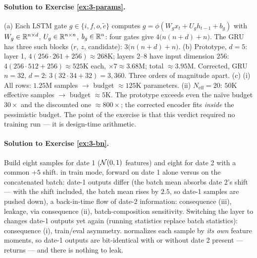 \paragraph{Solution to Exercise \ref{ex:3-params}.}
(a) Each LSTM gate $g \in \{i, f, o, \tilde c\}$ computes
$g = \phi(W_g x_t + U_g h_{t-1} + b_g)$ with $W_g \in \mathbb{R}^{n \times d}$,
$U_g \in \mathbb{R}^{n \times n}$, $b_g \in \mathbb{R}^n$: four gates give
$4\bigl(n(n+d) + n\bigr)$. The GRU has three such blocks ($r$, $z$,
candidate): $3\bigl(n(n+d)+n\bigr)$. (b) Prototype, $d = 5$: layer 1,
$4(256 \cdot 261 + 256) \approx 268$K; layers 2--8 have input dimension
$256$: $4(256 \cdot 512 + 256) \approx 525$K each, $\times 7 \approx
3.68$M; total $\approx 3.95$M. Corrected, GRU $n = 32$, $d = 2$:
$3(32 \cdot 34 + 32) = 3{,}360$. Three orders of magnitude apart.
(c) (i) All rows: $1.25$M samples $\to$ budget $\approx 125$K parameters.
(ii) $N_{\text{eff}} = 20$: $50$K effective samples $\to$ budget
$\approx 5$K. The prototype exceeds even the na\"ive budget $30\times$ and
the discounted one $\approx 800\times$; the corrected encoder fits
\emph{inside} the pessimistic budget. The point of the exercise is that
this verdict required no training run --- it is design-time arithmetic.

\paragraph{Solution to Exercise \ref{ex:3-bn}.}
Build eight samples for date 1 ($\mathcal{N}(0,1)$ features) and eight for date
2 with a common $+5$ shift.  in train mode, forward on
date 1 alone versus on the concatenated batch: date-1 outputs differ
(the batch mean absorbs date 2's shift --- with the shift included, the
batch mean rises by $2.5$, so date-1 samples are pushed down), a
back-in-time flow of date-2 information: consequence (iii), leakage, via
consequence (ii), batch-composition sensitivity. Switching the layer to
 changes date-1 outputs yet again (running statistics replace
batch statistics): consequence (i), train/eval asymmetry.
 normalizes each sample by \emph{its own} feature moments,
so date-1 outputs are bit-identical with or without date 2 present ---
 returns  --- and there is nothing to leak.

